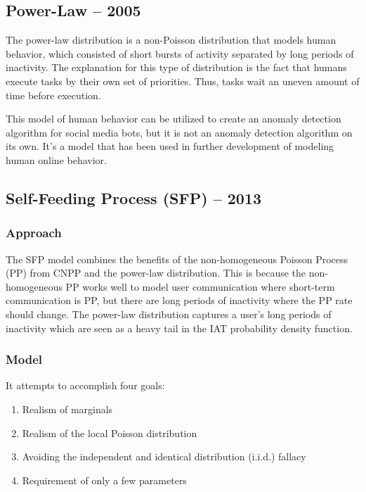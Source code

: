 \documentclass[11pt, oneside]{article}   	%
\begin{document}
\subsection*{Power-Law -- 2005}

\quad The power-law distribution \cite{powerlaw} is a non-Poisson distribution that models human behavior, which consisted of short bursts of activity separated by long periods of inactivity.
The explanation for this type of distribution is the fact that humans execute tasks by their own set of priorities.
Thus, tasks wait an uneven amount of time before execution. 

\quad This model of human behavior can be utilized to create an anomaly detection algorithm for social media bots, but it is not an anomaly detection algorithm on its own. It's a model that has been used in further development of modeling human online behavior.

\subsection*{Self-Feeding Process (SFP) -- 2013}

\subsubsection*{Approach}

\quad The SFP model \cite{sfp} combines the benefits of the non-homogeneous Poisson Process (PP) from CNPP and the power-law distribution.
This is because the non-homogeneous PP works well to model user communication where short-term communication is PP, but there are long periods of inactivity where the PP rate should change.
The power-law distribution captures a user's long periods of inactivity which are seen as a heavy tail in the IAT probability density function.

\subsubsection*{Model}

It attempts to accomplish four goals:
\begin{enumerate}
	\item Realism of marginals
	\item Realism of the local Poisson distribution
	\item Avoiding the independent and identical distribution (i.i.d.) fallacy
	\item Requirement of only a few parameters
\end{enumerate}
\end{document}
